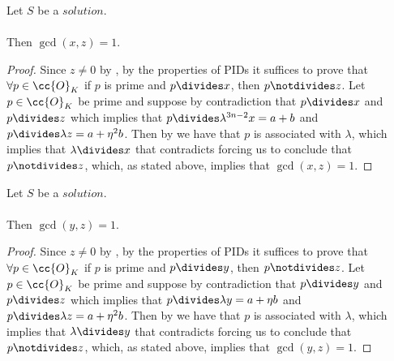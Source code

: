 \begin{lemma}
  \label{lmm:coprime_x_z}
  \leanok
  Let $S$ be a $solution$.\\\\
  Then $\gcd(x,z) = 1$.
\end{lemma}
\begin{proof}
  \leanok
  Since $z \neq 0$ by , by the properties of PIDs it suffices to prove that
  $\forall p \in \cc{O}_K$ if $p$ is prime and $p \divides x$, then $p \notdivides z$.
  Let $p \in \cc{O}_K$ be prime and suppose by contradiction that $p \divides x$ and $p \divides z$
  which implies that $p \divides \lambda^{3n-2} x = a+b$ and $p \divides \lambda z = a + \eta^2 b$.
  Then by 
  we have that $p$ is associated with $\lambda$, which implies that $\lambda \divides x$
  that contradicts  forcing us to conclude that $p \notdivides z$, which,
  as stated above, implies that $\gcd(x,z)=1$.
\end{proof}

\begin{lemma}
  \label{lmm:coprime_y_z}
  \leanok
  Let $S$ be a $solution$.\\\\
  Then $\gcd(y, z) = 1$.
\end{lemma}
\begin{proof}
  \leanok
  Since $z \neq 0$ by , by the properties of PIDs it suffices to prove that
  $\forall p \in \cc{O}_K$ if $p$ is prime and $p \divides y$, then $p \notdivides z$.
  Let $p \in \cc{O}_K$ be prime and suppose by contradiction that $p \divides y$ and $p \divides z$
  which implies that $p \divides \lambda y = a+\eta b$ and $p \divides \lambda z = a + \eta^2 b$.
  Then by 
  we have that $p$ is associated with $\lambda$, which implies that $\lambda \divides y$
  that contradicts  forcing us to conclude that $p \notdivides z$, which,
  as stated above, implies that $\gcd(y,z)=1$.
\end{proof}

